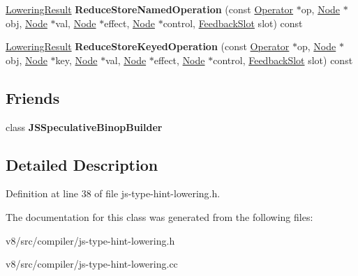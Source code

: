 \begin{DoxyCompactItemize}
\item 
\mbox{\label{classv8_1_1internal_1_1compiler_1_1JSTypeHintLowering_af17f19f05bda4105eed4d37f523b466c}} 
\mbox{\hyperlink{classv8_1_1internal_1_1compiler_1_1JSTypeHintLowering_1_1LoweringResult}{Lowering\+Result}} {\bfseries Reduce\+Store\+Named\+Operation} (const \mbox{\hyperlink{classv8_1_1internal_1_1compiler_1_1Operator}{Operator}} $\ast$op, \mbox{\hyperlink{classv8_1_1internal_1_1compiler_1_1Node}{Node}} $\ast$obj, \mbox{\hyperlink{classv8_1_1internal_1_1compiler_1_1Node}{Node}} $\ast$val, \mbox{\hyperlink{classv8_1_1internal_1_1compiler_1_1Node}{Node}} $\ast$effect, \mbox{\hyperlink{classv8_1_1internal_1_1compiler_1_1Node}{Node}} $\ast$control, \mbox{\hyperlink{classv8_1_1internal_1_1FeedbackSlot}{Feedback\+Slot}} slot) const
\item 
\mbox{\label{classv8_1_1internal_1_1compiler_1_1JSTypeHintLowering_aec3dfa3a986b38888d57095c1b65c043}} 
\mbox{\hyperlink{classv8_1_1internal_1_1compiler_1_1JSTypeHintLowering_1_1LoweringResult}{Lowering\+Result}} {\bfseries Reduce\+Store\+Keyed\+Operation} (const \mbox{\hyperlink{classv8_1_1internal_1_1compiler_1_1Operator}{Operator}} $\ast$op, \mbox{\hyperlink{classv8_1_1internal_1_1compiler_1_1Node}{Node}} $\ast$obj, \mbox{\hyperlink{classv8_1_1internal_1_1compiler_1_1Node}{Node}} $\ast$key, \mbox{\hyperlink{classv8_1_1internal_1_1compiler_1_1Node}{Node}} $\ast$val, \mbox{\hyperlink{classv8_1_1internal_1_1compiler_1_1Node}{Node}} $\ast$effect, \mbox{\hyperlink{classv8_1_1internal_1_1compiler_1_1Node}{Node}} $\ast$control, \mbox{\hyperlink{classv8_1_1internal_1_1FeedbackSlot}{Feedback\+Slot}} slot) const
\end{DoxyCompactItemize}
\subsection*{Friends}
\begin{DoxyCompactItemize}
\item 
\mbox{\label{classv8_1_1internal_1_1compiler_1_1JSTypeHintLowering_a9bedef980633fc8b35b0af29aaf59d36}} 
class {\bfseries J\+S\+Speculative\+Binop\+Builder}
\end{DoxyCompactItemize}


\subsection{Detailed Description}


Definition at line 38 of file js-\/type-\/hint-\/lowering.\+h.



The documentation for this class was generated from the following files\+:\begin{DoxyCompactItemize}
\item 
v8/src/compiler/js-\/type-\/hint-\/lowering.\+h\item 
v8/src/compiler/js-\/type-\/hint-\/lowering.\+cc\end{DoxyCompactItemize}
